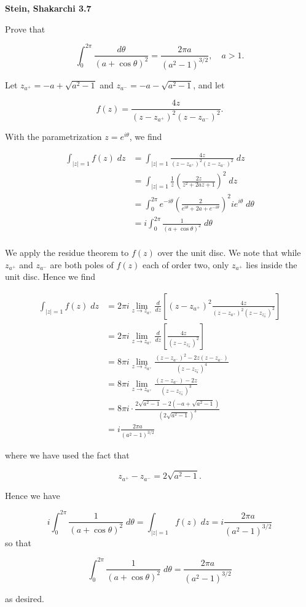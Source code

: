 \textbf{Stein, Shakarchi 3.7}

Prove that 

$$
\int_0^{2 \pi} {\frac{d \theta}{(a + \cos{\theta})^2}} = \frac{2 \pi a}{(a^2 - 1)^{3/2}}, \quad a > 1.
$$

\begin{solution}
  Let $z_{a^+} = -a + \sqrt{a^2 - 1}$ and $z_{a^-} = -a - \sqrt{a^2 - 1}$, and let

  $$
  f(z) = \frac{4 z}{(z - z_{a^+})^2 (z - z_{a^-})^2}.
  $$
  
  With the parametrization $z = e^{i \theta}$, we find

  \begin{align*}
    \int_{|z| = 1} { f(z) \; dz } 
      &= \int_{|z| = 1} { \frac{4 z}{(z - z_{a^+})^2 (z - z_{a^-})^2} \; dz } \\
      &= \int_{|z| = 1} { \frac{1}{z} \left( \frac{2z}{z^2 + 2 a z + 1} \right)^2 \; dz } \\
      &= \int_0^{2 \pi} { e^{-i \theta} \left( \frac{2}{e^{i \theta} + 2 a + e^{-i \theta}} \right)^2 i e^{i \theta} \; d\theta } \\
      &= i \int_0^{2 \pi} {\frac{1}{(a + \cos{\theta})^2} \; d\theta } \\
  \end{align*}

  We apply the residue theorem to $f(z)$ over the unit disc. We note that while $z_{a^+}$ and $z_{a^-}$ are both poles 
  of $f(z)$ each of order two, only $z_{a^+}$ lies inside the unit disc. Hence we find

  \begin{align*}
    \int_{|z| = 1} { f(z) \; dz } 
      &= 2 \pi i \lim_{z \to z_{a^+}} \frac{d}{dz} \left[ (z - z_{a^+})^2 \frac{4z}{(z - z_{a^+})^2 (z - z_{z_a^-})^2} \right] \\
      &= 2 \pi i \lim_{z \to z_{a^+}} \frac{d}{dz} \left[ \frac{4z}{(z - z_{z_a^-})^2} \right] \\
      &= 8 \pi i \lim_{z \to z_{a^+}} \frac{(z - z_{a^-})^2 - 2 z (z - z_{a^-})}{(z - z_{z_a^-})^4} \\
      &= 8 \pi i \lim_{z \to z_{a^+}} \frac{(z - z_{a^-}) - 2 z }{(z - z_{z_a^-})^3} \\
      &= 8 \pi i \cdot \frac{2\sqrt{a^2 - 1} - 2(-a + \sqrt{a^2 - 1})}{(2\sqrt{a^2 - 1})^3} \\
      &= i \frac{2 \pi a}{(a^2 - 1)^{3/2}}
  \end{align*}

  \pagebreak
  where we have used the fact that

  $$
  z_{a^+} - z_{a^-} = 2 \sqrt{a^2 - 1}.
  $$

  Hence we have 

  $$
    i \int_0^{2 \pi} {\frac{1}{(a + \cos{\theta})^2} \; d\theta } = \int_{|z| = 1} {f(z) \; dz} 
                                                                  = i \frac{2 \pi a}{(a^2 - 1)^{3/2}}
  $$
  so that 

  $$
    \int_0^{2 \pi} {\frac{1}{(a + \cos{\theta})^2} \; d\theta } = \frac{2 \pi a}{(a^2 - 1)^{3/2}}
  $$

  as desired.

  \ \\
\end{solution}